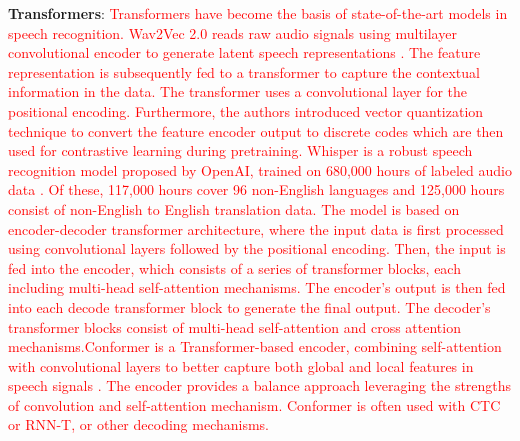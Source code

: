 \documentclass[preprint,12pt]{elsarticle}
\begin{document}
\textbf{Transformers}: \textcolor{red}{Transformers have become the basis of state-of-the-art models in speech recognition. Wav2Vec 2.0 reads raw audio signals using multilayer convolutional encoder to generate latent speech representations \citep{baevski_wav2vec_2020}. The feature representation is subsequently fed to a transformer to capture the contextual information in the data. The transformer uses a convolutional layer for the positional encoding. Furthermore, the authors introduced vector quantization technique to convert the feature encoder output to discrete codes which are then used for contrastive learning during pretraining. Whisper is a robust speech recognition model proposed by OpenAI, trained on 680,000 hours of labeled audio data \citep{radford_robust_2022}. Of these, 117,000 hours cover 96 non-English languages and 125,000 hours consist of non-English to English translation data. The model is based on encoder-decoder transformer architecture, where the input data is first processed using convolutional layers followed by the positional encoding. Then, the input is fed into the encoder, which consists of a series of transformer blocks, each including multi-head self-attention mechanisms. The encoder's output is then fed into each decode transformer block to generate the final output. The decoder's transformer blocks consist of multi-head self-attention and cross attention mechanisms.Conformer is a Transformer-based encoder, combining self-attention with convolutional layers to better capture both global and local features in speech signals \cite{gulati_conformer_2020}. The encoder provides a balance approach leveraging the strengths of convolution and self-attention mechanism. Conformer is often used with CTC or RNN-T, or other decoding mechanisms.}
\end{document}
